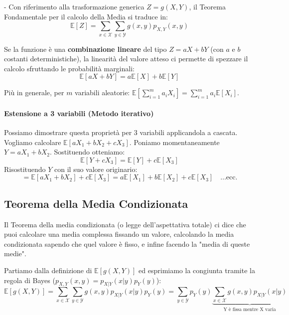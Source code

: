-
\newline
Con riferimento alla trasformazione generica $Z = g(X,Y)$, il Teorema Fondamentale per il calcolo della Media si traduce in:
\begin{equation}
    \mathbb{E}[Z] = \sum_{x \in \mathcal{X}} \sum_{y \in \mathcal{Y}} g(x,y)p_{X,Y}(x,y)
\end{equation}

Se la funzione è una \textbf{combinazione lineare} del tipo $Z = aX + bY$ (con $a$ e $b$ costanti deterministiche), la linearità del valore atteso ci permette di spezzare il calcolo sfruttando le probabilità marginali:
\begin{equation}
    \mathbb{E}[aX + bY] = a\mathbb{E}[X] + b\mathbb{E}[Y]
\end{equation}

Più in generale, per $m$ variabili aleatorie: $\mathbb{E}\left[\sum_{i=1}^m a_i X_i\right] = \sum_{i=1}^m a_i \mathbb{E}[X_i]$.

\paragraph{Estensione a 3 variabili (Metodo iterativo)}
Possiamo dimostrare questa proprietà per 3 variabili applicandola a cascata. Vogliamo calcolare $\mathbb{E}[aX_1 + bX_2 + cX_3]$.
Poniamo momentaneamente $Y = aX_1 + bX_2$. Sostituendo otteniamo:
\[
\mathbb{E}[Y + cX_3] = \mathbb{E}[Y] + c\mathbb{E}[X_3]
\]
Risostituendo $Y$ con il suo valore originario:
\[
= \mathbb{E}[aX_1 + bX_2] + c\mathbb{E}[X_3] = a\mathbb{E}[X_1] + b\mathbb{E}[X_2] + c\mathbb{E}[X_3] \quad \dots \text{ecc.}
\]

\subsection{Teorema della Media Condizionata}

Il Teorema della media condizionata (o legge dell'aspettativa totale) ci dice che puoi calcolare una media complessa fissando un valore, calcolando la media condizionata sapendo che quel valore è fisso, e infine facendo la "media di queste medie".

Partiamo dalla definizione di $\mathbb{E}[g(X,Y)]$ ed esprimiamo la congiunta tramite la regola di Bayes ($p_{X,Y}(x,y) = p_{X|Y}(x|y)p_Y(y)$):
\[
\mathbb{E}[g(X,Y)] = \sum_{x \in \mathcal{X}} \sum_{y \in \mathcal{Y}} g(x,y) p_{X|Y}(x|y)p_Y(y) = \sum_{y \in \mathcal{Y}} p_Y(y) \underbrace{\sum_{x \in \mathcal{X}} g(x,y) p_{X|Y}(x|y)}_{\text{Y è fissa mentre X varia}}
\]


